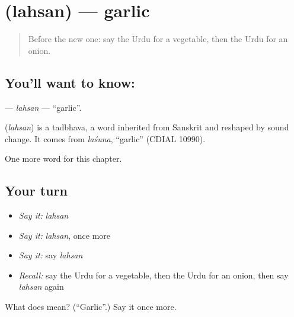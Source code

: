 \section[\texorpdfstring{\ur{لہسن} (lahsan)}{لہسن (lahsan)}]{ (lahsan) — garlic}

\label{lesson:UR-C114-lahsan}



\begin{quote}
Before the new one: say the Urdu for a vegetable, then the Urdu for an onion.
\end{quote}

\subsection*{You'll want to know: }
\textbf{} — \emph{lahsan} — \textquotedblleft{}garlic\textquotedblright{}.

\begin{cousinweb}
\textbf{} (\emph{lahsan}) is a tadbhava, a word inherited from Sanskrit and reshaped by sound change. It comes from \emph{laśuna}, \textquotedblleft{}garlic\textquotedblright{} (CDIAL 10990).
\end{cousinweb}

\begin{grammarlens}[title={What you've built}]
One more word for this chapter.
\end{grammarlens}

\subsection*{Your turn}
\begin{itemize}
\raggedright
  \item \emph{Say it:} \emph{lahsan}
  \item \emph{Say it:} \emph{lahsan}, once more
  \item \emph{Say it:} say \emph{lahsan}
  \item \emph{Recall:} say the Urdu for a vegetable, then the Urdu for an onion, then say \emph{lahsan} again
\end{itemize}

\begin{tcolorbox}[breakable,colback=teal!4,colframe=teal!35!black,title={Before you move on}]
What does  mean? (\textquotedblleft{}Garlic\textquotedblright{}.) Say it once more.
\end{tcolorbox}

